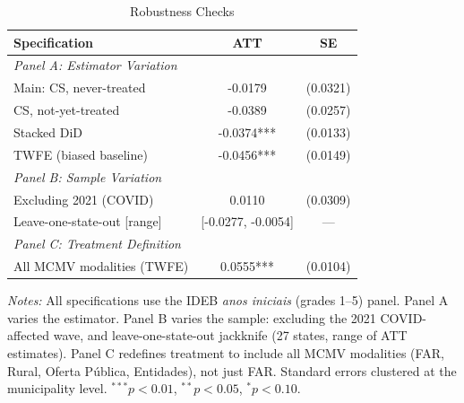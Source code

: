 \begin{table}[t]
\centering
\caption{Robustness Checks}
\label{tab:robustness}
\begin{threeparttable}
\begin{tabular}{lcc}
\toprule
Specification & ATT & SE \\
\midrule
\multicolumn{3}{l}{\textit{Panel A: Estimator Variation}} \\[3pt]
Main: CS, never-treated & -0.0179 & (0.0321) \\
CS, not-yet-treated & -0.0389 & (0.0257) \\
Stacked DiD & -0.0374*** & (0.0133) \\
TWFE (biased baseline) & -0.0456*** & (0.0149) \\
\midrule
\multicolumn{3}{l}{\textit{Panel B: Sample Variation}} \\[3pt]
Excluding 2021 (COVID) & 0.0110 & (0.0309) \\
Leave-one-state-out [range] & [-0.0277, -0.0054] & --- \\
\midrule
\multicolumn{3}{l}{\textit{Panel C: Treatment Definition}} \\[3pt]
All MCMV modalities (TWFE) & 0.0555*** & (0.0104) \\
\bottomrule
\end{tabular}
\begin{tablenotes}
\item \textit{Notes:} All specifications use the IDEB \textit{anos iniciais} (grades 1--5) panel. Panel A varies the estimator. Panel B varies the sample: excluding the 2021 COVID-affected wave, and leave-one-state-out jackknife (27 states, range of ATT estimates). Panel C redefines treatment to include all MCMV modalities (FAR, Rural, Oferta P\'{u}blica, Entidades), not just FAR. Standard errors clustered at the municipality level. $^{***}p<0.01$, $^{**}p<0.05$, $^{*}p<0.10$.
\end{tablenotes}
\end{threeparttable}
\end{table}
